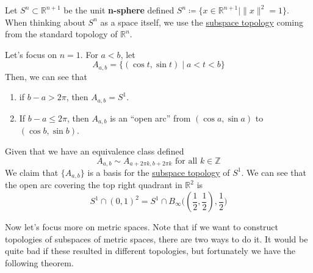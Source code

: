   \begin{example}
    \label{ex:unit-sphere-in-rn}
 
    Let $S^n \subset \mathbb{R}^{n+1}$ be the unit \textbf{n-sphere} defined $S^n \coloneqq \{x \in \mathbb{R}^{n+1} \mid \|x\|^2 = 1 \}$. When thinking about $S^n$ as a space itself, we use the \hyperref[def:subspace-topology]{subspace topology} coming from the standard topology of $\mathbb{R}^n$. 
  \end{example}

  \begin{example}
    \label{ex:s1subsetr2}
    Let's focus on $n = 1$. For $a < b$, let 
    \begin{equation}
      A_{a, b} = \{ (\cos{t}, \sin{t}) \mid a < t < b \}
    \end{equation} 
    Then, we can see that
    \begin{enumerate}
      \item if $b - a > 2 \pi$, then $A_{a, b} = S^1$. 
      \item If $b - a \leq 2 \pi$, then $A_{a, b}$ is an ``open arc'' from $(\cos{a}, \sin{a})$ to $(\cos{b}, \sin{b})$.  
    \end{enumerate} 

    Given that we have an equivalence class defined 
    \begin{equation}
      A_{a, b} \sim A_{a + 2 \pi k, b + 2 \pi k} \text{ for all } k \in \mathbb{Z}
    \end{equation} 
    We claim that $\{A_{a, b}\}$ is a basis for the \hyperref[def:subspace-topology]{subspace topology} of $S^1$. We can see that the open arc covering the top right quadrant in $\mathbb{R}^2$ is 
    \begin{equation}
      S^1 \cap (0, 1)^2 = S^1 \cap B_\infty \big( (\frac{1}{2}, \frac{1}{2}), \frac{1}{2} \big)
    \end{equation}
  \end{example}

  Now let's focus more on metric spaces. Note that if we want to construct topologies of subspaces of metric spaces, there are two ways to do it. It would be quite bad if these resulted in different topologies, but fortunately we have the following theorem. 

